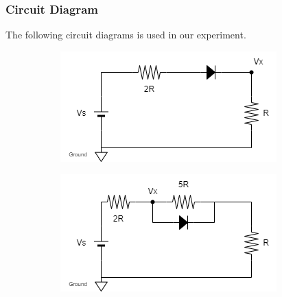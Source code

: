     \subsubsection{Circuit Diagram}
        The following circuit diagrams is used in our experiment.
        \begin{figure}[H]
            \centering
            \begin{subfigure}{0.4\textwidth}
                \includegraphics[width=1\linewidth]{Experiment_01/Circuit/Lab1a.png}
                \caption{ }
                \label{cir:1a}
            \end{subfigure}
            \begin{subfigure}{0.4\textwidth}
                \includegraphics[width=1\linewidth]{Experiment_01/Circuit/Lab1b.png}
                \caption{ }
                \label{cir:1b}
            \end{subfigure}


\end{figure}
